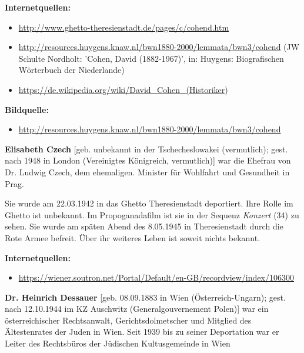 \documentclass[a4paper]{article}
\begin{document}
\bigskip

\textbf{Internetquellen:}

\begin{itemize}
\item \url{http://www.ghetto-theresienstadt.de/pages/c/cohend.htm} 
\item \url{http://resources.huygens.knaw.nl/bwn1880-2000/lemmata/bwn3/cohend} (JW Schulte Nordholt: 'Cohen, David
(1882-1967)', in: Huygens: Biografischen Wörterbuch der Niederlande)
\item \url{https://de.wikipedia.org/wiki/David_Cohen_(Historiker}) 
\end{itemize}

\bigskip

\textbf{Bildquelle:}

\begin{itemize}
\item \url{http://resources.huygens.knaw.nl/bwn1880-2000/lemmata/bwn3/cohend}
\end{itemize}
\textbf{Elisabeth Czech} [geb. unbekannt in der Tschecheslowakei (vermutlich); gest. nach 1948 in London (Vereinigtes
Königreich, vermutlich)] war die Ehefrau von Dr. Ludwig Czech, dem ehemaligen. Minister für Wohlfahrt und Gesundheit in
Prag.

Sie wurde am 22.03.1942 in das Ghetto Theresienstadt deportiert. Ihre Rolle im Ghetto ist unbekannt. Im Propoganadafilm
ist sie in der Sequenz \textit{Konzert} (34) zu sehen. Sie wurde am späten Abend des 8.05.1945 in Theresienstadt durch
die Rote Armee befreit. Über ihr weiteres Leben ist soweit nichts bekannt.


\bigskip


\bigskip

\textbf{Internetquellen:}

\begin{itemize}
\item \url{https://wiener.soutron.net/Portal/Default/en-GB/recordview/index/106300}
\end{itemize}

\bigskip


\bigskip

\textbf{Dr. Heinrich Dessauer }[geb. 08.09.1883 in Wien (Österreich-Ungarn); gest. nach 12.10.1944 im KZ Auschwitz
(Generalgouvernement Polen)] war ein österreichischer Rechtsanwalt, Gerichtsdolmetscher und Mitglied des Ältestenrates
der Juden in Wien. Seit 1939 bis zu seiner Deportation war er Leiter des Rechtsbüros der Jüdischen Kultusgemeinde in
Wien
\end{document}
